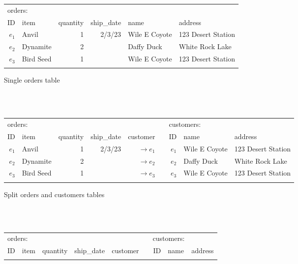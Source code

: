 \documentclass[english,submission]{programming}
\theoremstyle{definition}
\begin{document}
\begin{figure}
\begin{subfigure}[b]{35em}\vspace{0pt}
  \sffamily
  \small
  \begin{tabular}{ r|l|r|r|l|l|}
  \multicolumn{2}{l}{orders:}\\
     \hhline{~-----}
     ID & item & quantity & ship\_date & name & address \\
     \hhline{~=====}

     $e_1$ & Anvil & 1 & 2/3/23 & Wile E Coyote & 123 Desert Station \\
     \hhline{~-----}
     $e_2$ & Dynamite & 2 & & Daffy Duck & White Rock Lake \\
     \hhline{~-----}
     $e_3$ & Bird Seed & 1 & & Wile E Coyote & 123 Desert Station \\
     \hhline{~-----}
  \end{tabular}
  \caption{Single orders table}
  \label{fig:tables-single}
\end{subfigure}
\\[-0.5em]~\\
\begin{subfigure}[b]{40em}\vspace{0pt}
  \sffamily
  \small
  \begin{tabular}{ r|l|r|r|r|cr|l|l|}
  \multicolumn{2}{l}{orders:}&\multicolumn{4}{l}{}&\multicolumn{2}{l}{customers:}\\
     \hhline{~----~~--}
     ID & item & quantity & ship\_date & customer && ID & name & address \\
     \hhline{~====~~==}

     $e_1$ & Anvil & 1 & 2/3/23 & $\rightarrow\!e_1$ && $e_1$ & Wile E Coyote & 123 Desert Station \\
     \hhline{~----~~--}
     $e_2$ & Dynamite & 2 & & $\rightarrow\!e_2$ && $e_2$ & Daffy Duck & White Rock Lake \\
     \hhline{~----~~--}
     $e_3$ & Bird Seed & 1 & & $\rightarrow\!e_3$ && $e_3$ & Wile E Coyote & 123 Desert Station \\
     \hhline{~----~~--}
  \end{tabular}
  \caption{Split orders and customers tables}
  \label{fig:tables-split}
\end{subfigure}
\\[-0.5em]~\\
\begin{subfigure}[b]{40em}\vspace{0pt}
  \sffamily
  \small
  \begin{tabular}{ r|l|r|r|r|cr|l|l|}
  \multicolumn{2}{l}{orders:}&\multicolumn{4}{l}{}&\multicolumn{2}{l}{customers:}\\
     \hhline{~----~~--}
     ID & item & quantity & ship\_date & customer && ID & name & address \\
     \hhline{~====~~==}


\end{tabular}
\end{subfigure}
\end{figure}
\end{document}
